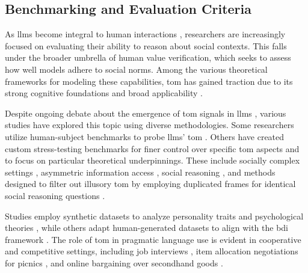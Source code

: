\subsection{Benchmarking and Evaluation Criteria}


As \acp{llm} become integral to human interactions \cite{lee2023if}, researchers are increasingly focused on evaluating their ability to reason about social contexts. This falls under the broader umbrella of human value verification, which seeks to assess how well models adhere to social norms. Among the various theoretical frameworks for modeling these capabilities, \ac{tom} has gained traction due to its strong cognitive foundations and broad applicability \cite{kosinski2024evaluating, streetLLMTheoryMind2024}. 


Despite ongoing debate about the emergence of \ac{tom} signals in \acp{llm} \cite{sapNeuralTheoryofMindLimits2022, shapiraCleverHansNeural2023}, various studies have explored this topic using diverse methodologies. Some researchers utilize human-subject benchmarks to probe \acp{llm}' \ac{tom} \cite{duijnTheoryMindLarge2023, strachanTestingTheoryMind2024}.  Others have created custom stress-testing benchmarks for finer control over specific \ac{tom} aspects and to focus on particular theoretical underpinnings. These include socially complex settings \cite{houEnteringRealSocial2024a}, asymmetric information access \cite{kimFANToMBenchmarkStresstesting2023}, social reasoning \cite{sapSocialIQACommonsenseReasoning2019}, and methods designed to filter out illusory \ac{tom} by employing duplicated frames for identical social reasoning questions \cite{chanNegotiationToMBenchmarkStresstesting2024}.


Studies employ synthetic datasets to analyze personality traits and psychological theories \cite{xuOpenToMComprehensiveBenchmark2024a}, while others adapt human-generated datasets to align with the \ac{bdi} framework \cite{chanNegotiationToMBenchmarkStresstesting2024}. The role of \ac{tom} in pragmatic language use is evident in cooperative and competitive settings, including job interviews \cite{zhan2024let}, item allocation negotiations for picnics \cite{chawlaCaSiNoCorpusCampsite2021}, and online bargaining over secondhand goods \cite{heDecouplingStrategyGeneration2018, heddayaLanguageBargaining2024}.